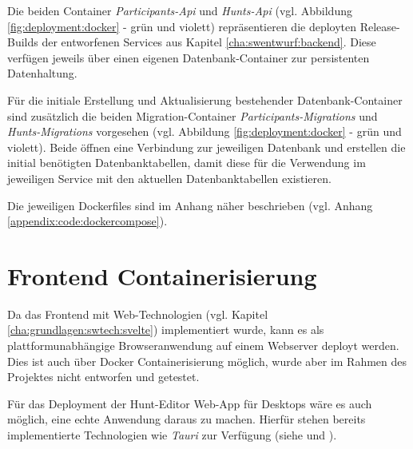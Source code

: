 Die beiden Container \textit{Participants-Api} und \textit{Hunts-Api} (vgl. Abbildung \ref{fig:deployment:docker} - grün und violett) repräsentieren die deployten Release-Builds der entworfenen Services aus Kapitel \ref{cha:swentwurf:backend}. Diese verfügen jeweils über einen eigenen Datenbank-Container zur persistenten Datenhaltung.

Für die initiale Erstellung und Aktualisierung bestehender Datenbank-Container sind zusätzlich die beiden Migration-Container \textit{Participants-Migrations} und \textit{Hunts-Migrations} vorgesehen (vgl. Abbildung \ref{fig:deployment:docker} - grün und violett). Beide öffnen eine Verbindung zur jeweiligen Datenbank und erstellen die initial benötigten Datenbanktabellen, damit diese für die Verwendung im jeweiligen Service mit den aktuellen Datenbanktabellen existieren.

Die jeweiligen Dockerfiles sind im Anhang näher beschrieben (vgl. Anhang \ref{appendix:code:dockercompose}).

\section{Frontend Containerisierung}

Da das Frontend mit Web-Technologien (vgl. Kapitel \ref{cha:grundlagen:swtech:svelte}) implementiert wurde, kann es als plattformunabhängige Browseranwendung auf einem Webserver deployt werden. Dies ist auch über Docker Containerisierung möglich, wurde aber im Rahmen des Projektes nicht entworfen und getestet.

Für das Deployment der Hunt-Editor Web-App für Desktops wäre es auch möglich, eine echte Anwendung daraus zu machen. Hierfür stehen bereits implementierte Technologien wie \textit{Tauri} zur Verfügung (siehe \autocite{github:tauri} und \autocite{tauri:tauri}).
